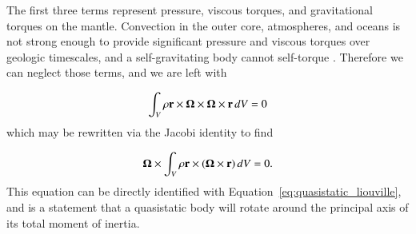 \documentclass[preprint,12pt,authoryear]{elsarticle}
\newcommand{\mitbf}[1]{\hbox{\mathversion{bold}$#1$}}
\newif\ifdetail
\begin{document}
The first three terms represent pressure, viscous torques, and gravitational torques on the mantle.  
Convection in the outer core, atmospheres, and oceans is not strong enough to provide significant pressure and viscous torques over geologic timescales, and a self-gravitating body cannot self-torque \citep{braginsky1995equations}.
Therefore we can neglect those terms, and we are left with

\begin{equation}
\begin{aligned}
\int_V \rho \mathbf{r} \times \mitbf{\Omega} \times \mitbf{\Omega} \times \mathbf{r} \,dV &= 0 \\
\label{eq:quasistatic_angular_momentum}
\end{aligned}
\end{equation}
which may be rewritten via the Jacobi identity to find
\ifdetail
\begin{equation}
\begin{aligned}
- \int_V \rho (\mitbf{\Omega}\times \mathbf{r}) \times ( \mathbf{r} \times \mitbf{\Omega} ) \,dV + 
- \int_V \rho \mitbf{\Omega}\times(\mitbf{\Omega}\times \mathbf{r}) \times \mathbf{r} \,dV &= 0 \\
\end{aligned}
\end{equation}
\fi
\begin{equation}
\begin{aligned}
 \mitbf{\Omega} \times \int_V \rho \mathbf{r} \times (\mitbf{\Omega}\times \mathbf{r}) \,dV &= 0. \\
\end{aligned}
\end{equation}
This equation can be directly identified with Equation~\eqref{eq:quasistatic_liouville},
and is a statement that a quasistatic body will rotate around the principal axis of its total moment of inertia.
\end{document}
